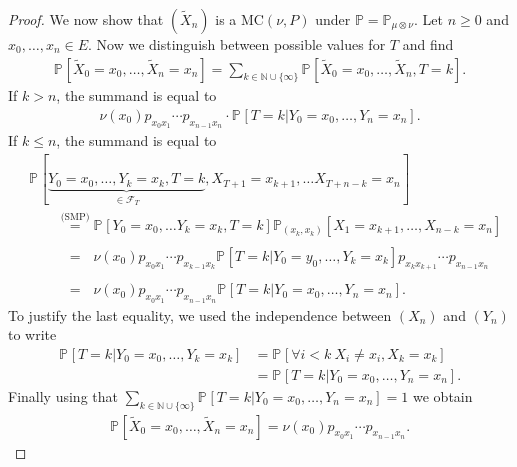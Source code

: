 \begin{proof}
We now show that $(\tilde{X}_n)$ is a MC$(\nu, P)$ under $\mathbb{P} = \mathbb{P}_{\mu \otimes \nu}$. Let $n\geq 0$ and $x_0, \ldots, x_n \in E$. Now we distinguish between possible values for $T$ and find
\begin{align}
	\mathbb{P}_{} \left[ \tilde{X}_0 = x_0, \ldots , \tilde{X}_n = x_n \right] = \sum_{k \in \mathbb{N} \cup \{\infty\}}^{} \mathbb{P}_{} \left[ \tilde{X}_0 = x_0, \ldots , \tilde{X}_n , T=k \right] .
\end{align}
If $k>n$, the summand is equal to 
\begin{align}
	\nu (x_0) p_{x_0x_1}\cdots p_{x_{n-1}x_n} \cdot \mathbb{P}_{} \left[ T=k | Y_0 = x_0, \ldots , Y_n=x_n \right].
\end{align}
If $k \leq n$, the summand is equal to
\begin{align}
	&\mathbb{P}_{} \left[ \underbrace{Y_0=x_0, \ldots , Y_k=x_k,T=k}_{\in \mathcal{F}_T},X_{T+1}=x_{k+1}, \ldots X_{T+n-k}=x_n \right]  \\
	&\qquad \stackrel{\textrm{(SMP)}}{=} \mathbb{P}_{} \left[ Y_0=x_0, \ldots Y_k=x_k, T=k \right] \mathbb{P}_{(x_k, x_k)} \left[ X_1=x_{k+1}, \ldots , X_{n-k}=x_n \right]  \\
	&\qquad \stackrel{\phantom{\textrm{(SMP)}}}{=} \nu (x_0) p_{x_0x_1}\cdots p_{x_{k-1}x_k} \mathbb{P}_{} \left[ T=k | Y_0 = y_0, \ldots, Y_k=x_k \right] p_{x_k x_{k+1}} \cdots p_{x_{n-1}x_n}  \\
	&\qquad \stackrel{\phantom{\textrm{(SMP)}}}{=} \nu (x_0) p_{x_0 x_1} \cdots p_{x_{n-1}x_n} \mathbb{P}_{} \left[ T=k | Y_0=x_0, \ldots, Y_n=x_n \right]  .
\end{align}
To justify the last equality, we used the independence between $(X_n)$ and $(Y_n)$ to write
 \begin{align}
	 \mathbb{P}_{} \left[ T=k | Y_0=x_0, \ldots , Y_k =x_k \right] &= \mathbb{P}_{} \left[ \forall i<k\ X_i \neq x_i, X_k=x_k \right] \\
								       &= \mathbb{P}_{} \left[ T=k | Y_0=x_0, \ldots , Y_n=x_n \right] . 
\end{align}
Finally using that $\sum_{k \in \mathbb{N}\cup \{\infty\}}^{} \mathbb{P}_{} \left[ T=k | Y_0 = x_0, \ldots , Y_n =x_n \right] =1$ we obtain
\begin{align}
	\mathbb{P}_{} \left[ \tilde{X}_0 = x_0, \ldots , \tilde{X}_n=x_n \right] = \nu (x_0) p_{x_0 x_1} \cdots p_{x_{n-1}x_n}.
\end{align}


\end{proof}
